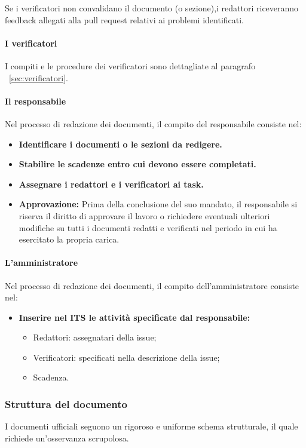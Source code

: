 \documentclass{article}
\begin{document}
Se i verificatori non convalidano il documento (o sezione),i redattori riceveranno feedback allegati alla pull request relativi ai problemi identificati.
\paragraph{I verificatori}
I compiti e le procedure dei verificatori sono dettagliate al paragrafo ~\ref{sec:verificatori}.
\paragraph{Il responsabile}
Nel processo di redazione dei documenti, il compito del responsabile consiste nel:
\begin{itemize}
    \item \textbf{Identificare i documenti o le sezioni da redigere. }
    \item \textbf{Stabilire le scadenze entro cui devono essere completati.}
    \item \textbf{Assegnare i redattori e i verificatori ai task.}
    \item \textbf{Approvazione:} Prima della conclusione del suo mandato, il responsabile si riserva il diritto di approvare il lavoro o richiedere eventuali ulteriori modifiche su tutti i documenti redatti e verificati nel periodo in cui ha esercitato la propria carica.
\end{itemize}

\paragraph{L'amministratore}
Nel processo di redazione dei documenti, il compito dell'amministratore consiste nel:
\begin{itemize}
    \item \textbf{Inserire nel ITS le attività specificate dal responsabile:} \begin{itemize}
              \item Redattori: assegnatari della issue;
              \item Verificatori: specificati nella descrizione della issue;
              \item Scadenza.
          \end{itemize}
\end{itemize}
\subsubsection{Struttura del documento}
I documenti ufficiali seguono un rigoroso e uniforme schema strutturale, il quale richiede un'osservanza scrupolosa.
\end{document}

